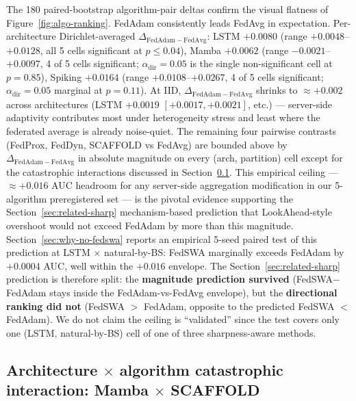 \documentclass[journal]{IEEEtran}
\newcommand{\alphadir}{\ensuremath{\alpha_{\mathrm{dir}}}}
\begin{document}
The 180 paired-bootstrap algorithm-pair deltas confirm the visual flatness of Figure~\ref{fig:algo-ranking}. FedAdam consistently leads FedAvg in expectation. Per-architecture Dirichlet-averaged $\Delta_{\mathrm{FedAdam} - \mathrm{FedAvg}}$: LSTM $+0.0080$ (range $+0.0048$--$+0.0128$, all 5 cells significant at $p \leq 0.04$), Mamba $+0.0062$ (range $-0.0021$--$+0.0097$, 4 of 5 cells significant; $\alphadir = 0.05$ is the single non-significant cell at $p = 0.85$), Spiking $+0.0164$ (range $+0.0108$--$+0.0267$, 4 of 5 cells significant; $\alphadir = 0.05$ marginal at $p = 0.11$). At IID, $\Delta_{\mathrm{FedAdam} - \mathrm{FedAvg}}$ shrinks to $\approx +0.002$ across architectures (LSTM $+0.0019$ $[+0.0017, +0.0021]$, etc.) --- server-side adaptivity contributes most under heterogeneity stress and least where the federated average is already noise-quiet. The remaining four pairwise contrasts (FedProx, FedDyn, SCAFFOLD vs FedAvg) are bounded above by $\Delta_{\mathrm{FedAdam} - \mathrm{FedAvg}}$ in absolute magnitude on every (arch, partition) cell except for the catastrophic interactions discussed in Section~\ref{sec:mamba-scaffold}. This empirical ceiling --- $\approx +0.016$ AUC headroom for any server-side aggregation modification in our 5-algorithm preregistered set --- is the pivotal evidence supporting the Section~\ref{sec:related-sharp} mechanism-based prediction that LookAhead-style overshoot would not exceed FedAdam by more than this magnitude. Section~\ref{sec:why-no-fedswa} reports an empirical 5-seed paired test of this prediction at LSTM $\times$ natural-by-BS: FedSWA marginally exceeds FedAdam by $+0.0004$ AUC, well within the $+0.016$ envelope. The Section~\ref{sec:related-sharp} prediction is therefore split: the \textbf{magnitude prediction survived} (FedSWA$-$FedAdam stays inside the FedAdam-vs-FedAvg envelope), but the \textbf{directional ranking did not} (FedSWA $>$ FedAdam, opposite to the predicted FedSWA $<$ FedAdam). We do not claim the ceiling is ``validated'' since the test covers only one (LSTM, natural-by-BS) cell of one of three sharpness-aware methods.

\subsection{Architecture $\times$ algorithm catastrophic interaction: Mamba $\times$ SCAFFOLD}\label{sec:mamba-scaffold}
\end{document}
